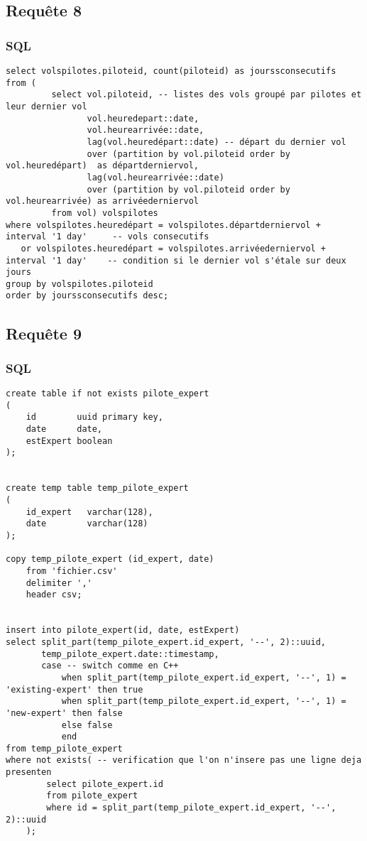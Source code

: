 \documentclass[french, utf8]{article}
\begin{document}
\subsection{Requête 8}
\subsubsection{SQL}
\begin{verbatim}
select volspilotes.piloteid, count(piloteid) as jourssconsecutifs
from (
         select vol.piloteid, -- listes des vols groupé par pilotes et leur dernier vol
                vol.heuredepart::date,
                vol.heurearrivée::date,
                lag(vol.heuredépart::date) -- départ du dernier vol
                over (partition by vol.piloteid order by vol.heuredépart)  as départderniervol,
                lag(vol.heurearrivée::date)
                over (partition by vol.piloteid order by vol.heurearrivée) as arrivéederniervol
         from vol) volspilotes
where volspilotes.heuredépart = volspilotes.départderniervol + interval '1 day'     -- vols consecutifs
   or volspilotes.heuredépart = volspilotes.arrivéederniervol + interval '1 day'    -- condition si le dernier vol s'étale sur deux jours
group by volspilotes.piloteid
order by jourssconsecutifs desc;
\end{verbatim}
\newpage

\subsection{Requête 9}
\subsubsection{SQL}

\begin{verbatim}
create table if not exists pilote_expert
(
    id        uuid primary key,
    date      date,
    estExpert boolean
);


create temp table temp_pilote_expert
(
    id_expert   varchar(128),
    date        varchar(128)
);

copy temp_pilote_expert (id_expert, date)
    from 'fichier.csv'
    delimiter ','
    header csv;


insert into pilote_expert(id, date, estExpert)
select split_part(temp_pilote_expert.id_expert, '--', 2)::uuid,
       temp_pilote_expert.date::timestamp,
       case -- switch comme en C++
           when split_part(temp_pilote_expert.id_expert, '--', 1) = 'existing-expert' then true
           when split_part(temp_pilote_expert.id_expert, '--', 1) = 'new-expert' then false
           else false
           end
from temp_pilote_expert
where not exists( -- verification que l'on n'insere pas une ligne deja presenten
        select pilote_expert.id
        from pilote_expert
        where id = split_part(temp_pilote_expert.id_expert, '--', 2)::uuid
    );

\end{verbatim}
\newpage
\end{document}

